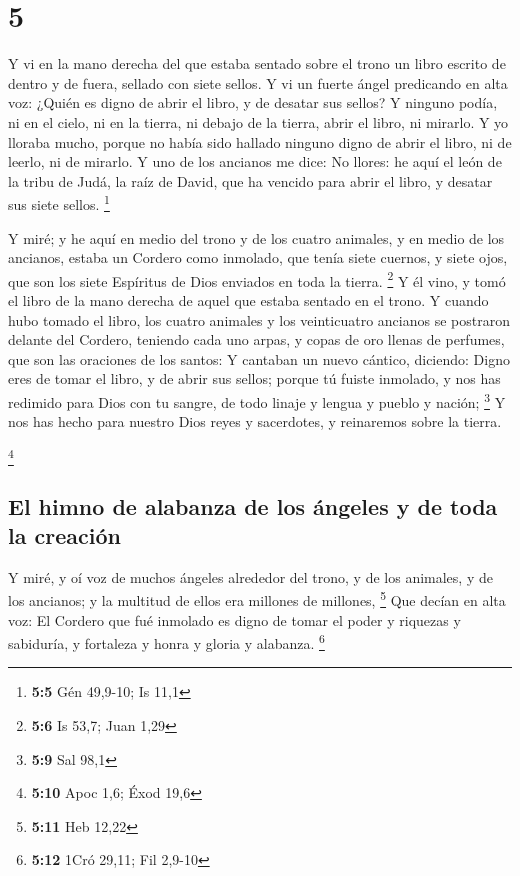 \hypertarget{section-4}{%
\section{5}\label{section-4}}

 Y vi en la mano derecha del que estaba sentado sobre el
trono un libro escrito de dentro y de fuera, sellado con siete sellos.
 Y vi un fuerte ángel predicando en alta voz: ¿Quién es
digno de abrir el libro, y de desatar sus sellos?  Y ninguno
podía, ni en el cielo, ni en la tierra, ni debajo de la tierra, abrir el
libro, ni mirarlo.  Y yo lloraba mucho, porque no había sido
hallado ninguno digno de abrir el libro, ni de leerlo, ni de mirarlo.
 Y uno de los ancianos me dice: No llores: he aquí el león
de la tribu de Judá, la raíz de David, que ha vencido para abrir el
libro, y desatar sus siete sellos. \footnote{\textbf{5:5} Gén 49,9-10;
  Is 11,1}

 Y miré; y he aquí en medio del trono y de los cuatro
animales, y en medio de los ancianos, estaba un Cordero como inmolado,
que tenía siete cuernos, y siete ojos, que son los siete Espíritus de
Dios enviados en toda la tierra. \footnote{\textbf{5:6} Is 53,7; Juan
  1,29}  Y él vino, y tomó el libro de la mano derecha de
aquel que estaba sentado en el trono.  Y cuando hubo tomado
el libro, los cuatro animales y los veinticuatro ancianos se postraron
delante del Cordero, teniendo cada uno arpas, y copas de oro llenas de
perfumes, que son las oraciones de los santos:  Y cantaban
un nuevo cántico, diciendo: Digno eres de tomar el libro, y de abrir sus
sellos; porque tú fuiste inmolado, y nos has redimido para Dios con tu
sangre, de todo linaje y lengua y pueblo y nación; \footnote{\textbf{5:9}
  Sal 98,1}  Y nos has hecho para nuestro Dios reyes y
sacerdotes, y reinaremos sobre la tierra.

\footnote{\textbf{5:10} Apoc 1,6; Éxod 19,6}

\hypertarget{el-himno-de-alabanza-de-los-uxe1ngeles-y-de-toda-la-creaciuxf3n}{%
\subsection{El himno de alabanza de los ángeles y de toda la
creación}\label{el-himno-de-alabanza-de-los-uxe1ngeles-y-de-toda-la-creaciuxf3n}}

 Y miré, y oí voz de muchos ángeles alrededor del trono, y
de los animales, y de los ancianos; y la multitud de ellos era millones
de millones, \footnote{\textbf{5:11} Heb 12,22}  Que decían
en alta voz: El Cordero que fué inmolado es digno de tomar el poder y
riquezas y sabiduría, y fortaleza y honra y gloria y alabanza.
\footnote{\textbf{5:12} 1Cró 29,11; Fil 2,9-10}

